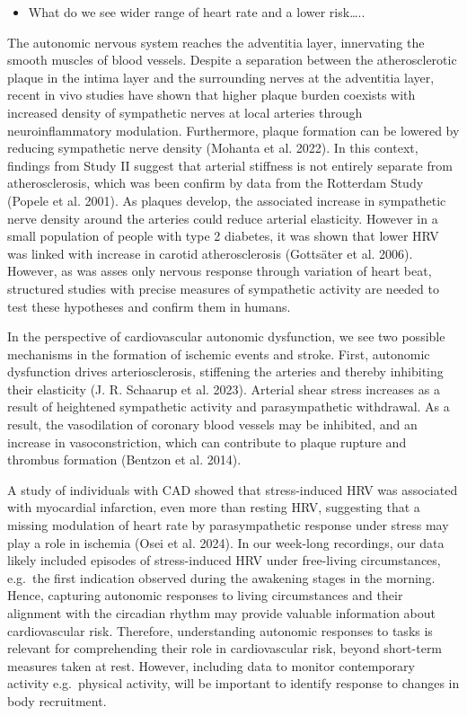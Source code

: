 \documentclass[
  a4paper,
  headsepline=true,
  open=any]{scrbook}
\providecommand{\tightlist}{%
  \setlength{\itemsep}{0pt}\setlength{\parskip}{0pt}}\usepackage{longtable,booktabs,array}
\begin{document}
\begin{itemize}
\tightlist
\item
  What do we see wider range of heart rate and a lower risk\ldots..
\end{itemize}

The autonomic nervous system reaches the adventitia layer, innervating
the smooth muscles of blood vessels. Despite a separation between the
atherosclerotic plaque in the intima layer and the surrounding nerves at
the adventitia layer, recent in vivo studies have shown that higher
plaque burden coexists with increased density of sympathetic nerves at
local arteries through neuroinflammatory modulation. Furthermore, plaque
formation can be lowered by reducing sympathetic nerve density (Mohanta
et al. 2022). In this context, findings from Study II suggest that
arterial stiffness is not entirely separate from atherosclerosis, which
was been confirm by data from the Rotterdam Study (Popele et al. 2001).
As plaques develop, the associated increase in sympathetic nerve density
around the arteries could reduce arterial elasticity. However in a small
population of people with type 2 diabetes, it was shown that lower HRV
was linked with increase in carotid atherosclerosis (Gottsäter et al.
2006). However, as was asses only nervous response through variation of
heart beat, structured studies with precise measures of sympathetic
activity are needed to test these hypotheses and confirm them in humans.

In the perspective of cardiovascular autonomic dysfunction, we see two
possible mechanisms in the formation of ischemic events and stroke.
First, autonomic dysfunction drives arteriosclerosis, stiffening the
arteries and thereby inhibiting their elasticity (J. R. Schaarup et al.
2023). Arterial shear stress increases as a result of heightened
sympathetic activity and parasympathetic withdrawal. As a result, the
vasodilation of coronary blood vessels may be inhibited, and an increase
in vasoconstriction, which can contribute to plaque rupture and thrombus
formation (Bentzon et al. 2014).

A study of individuals with CAD showed that stress-induced HRV was
associated with myocardial infarction, even more than resting HRV,
suggesting that a missing modulation of heart rate by parasympathetic
response under stress may play a role in ischemia (Osei et al. 2024). In
our week-long recordings, our data likely included episodes of
stress-induced HRV under free-living circumstances, e.g.~the first
indication observed during the awakening stages in the morning. Hence,
capturing autonomic responses to living circumstances and their
alignment with the circadian rhythm may provide valuable information
about cardiovascular risk. Therefore, understanding autonomic responses
to tasks is relevant for comprehending their role in cardiovascular
risk, beyond short-term measures taken at rest. However, including data
to monitor contemporary activity e.g.~physical activity, will be
important to identify response to changes in body recruitment.
\end{document}
